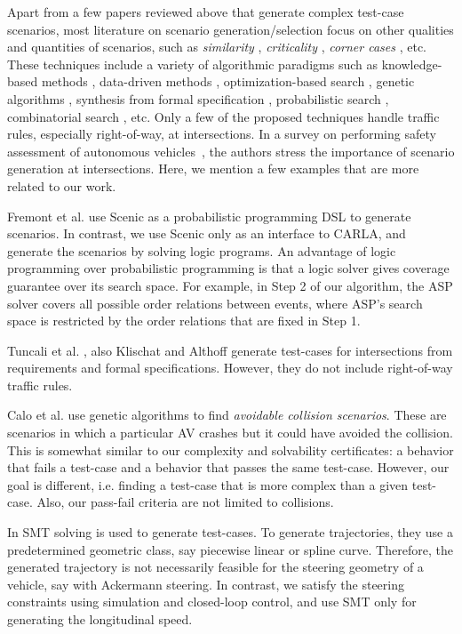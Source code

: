 Apart from a few papers reviewed above that generate complex test-case scenarios, most literature on scenario generation/selection focus on other qualities and quantities of scenarios, such as \emph{similarity} \cite{Harder.2021}, \emph{criticality} \cite{Klischat.2019, Zhong.2021}, \emph{corner cases} \cite{OKelly.2018}, etc.
%
These techniques include a variety of algorithmic paradigms such as  knowledge-based methods \cite{Li.2020}, data-driven methods \cite{OKelly.2018}, optimization-based search \cite{Klischat.2020, Feng_Methodology.2020, Feng_CaseStudies.2020}, genetic algorithms \cite{Klischat.2019, Calo.2020, Zhong.2021}, synthesis from formal specification \cite{Klischat.2020, Tuncali.2019}, probabilistic search \cite{Fremont_testing.2020, Tuncali.2016}, combinatorial search \cite{Tuncali.2019, Gao.2019, Xia.2018}, etc.
%
Only a few of the proposed techniques handle traffic rules, especially right-of-way, at intersections.
%
In a survey on performing safety assessment of autonomous vehicles~\cite{Riedmaier.2020}, the authors stress the importance of scenario generation at intersections.
%
Here, we mention a few examples that are more related to our work.


Fremont et al. \cite{Fremont_testing.2020} use Scenic as a probabilistic programming DSL to generate scenarios.
%
In contrast, we use Scenic only as an interface to CARLA, and generate the scenarios by solving logic programs.
%
An advantage of logic programming over probabilistic programming is that a logic solver gives coverage guarantee over its search space.
%
For example, in Step 2 of our algorithm, the ASP solver covers all possible order relations between events, where ASP's search space is restricted by the order relations that are fixed in Step 1.


Tuncali et al. \cite{Tuncali.2019}, also Klischat and Althoff \cite{Klischat.2020} generate test-cases for intersections from requirements and formal specifications.
%
However, they do not include right-of-way traffic rules.


Calo et al. \cite{Calo.2020} use genetic algorithms to find \emph{avoidable collision scenarios}.
%
These are scenarios in which a particular AV crashes but it could have avoided the collision.
%
This is somewhat similar to our complexity and solvability certificates: a behavior that fails a test-case and a behavior that passes the same test-case.
%
However, our goal is different, i.e. finding a test-case that is more complex than a given test-case.
%
Also, our pass-fail criteria are not limited to collisions.


In \cite{kim2019test} SMT solving is used to generate test-cases.
%
To generate trajectories, they use a predetermined geometric class, say piecewise linear or spline curve. 
%
Therefore, the generated trajectory is not necessarily feasible for the steering geometry of a vehicle, say with Ackermann steering.
%
In contrast, we satisfy the steering constraints using simulation and closed-loop control, and use SMT only for generating the longitudinal speed.
